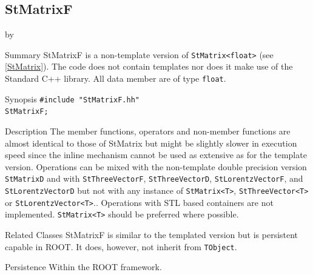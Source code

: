 \documentclass[twoside]{article}
\newcommand{\entrylabel}[1]{\mbox{\textbf{{#1}}}\hfil}%
\newenvironment{entry}
{\begin{list}{}%
    {\renewcommand{\makelabel}{\entrylabel}%
     \setlength{\labelwidth}{90pt}%
     \setlength{\leftmargin}{\labelwidth}
     \advance\leftmargin by \labelsep%
      }%
    }%
  {\end{list}}
\newcommand{\Entrylabel}[1]%
{\raisebox{0pt}[1ex][0pt]{\makebox[\labelwidth][l]%
    {\parbox[t]{\labelwidth}{\hspace{0pt}\textbf{{#1}}}}}}
\newenvironment{Entry}%
{\renewcommand{\entrylabel}{\Entrylabel}\begin{entry}}%
  {\end{entry}}
\begin{document}
\subsection{StMatrixF } \label{StMatrixF}
\begin{Entry}
\item[Summary]
    StMatrixF is a non-template version of \verb+StMatrix<float>+
    (see \ref{StMatrix}). The code does not contain templates nor
    does it make use of the Standard C++ library. All data member are of
    type \texttt{float}.
    
\item[Synopsis]
    \verb+#include "StMatrixF.hh"+ \\
    \verb+StMatrixF;+
    
    
\item[Description]       
    The member functions, operators and non-member functions are almost identical
    to those of StMatrix but might be slightly slower in execution speed
    since the inline mechanism cannot be used as extensive as for the template
    version. Operations can be mixed with the non-template double precision version
    \texttt{StMatrixD} and with \texttt{StThreeVectorF}, \texttt{StThreeVectorD},
    \texttt{StLorentzVectorF}, and \texttt{StLorentzVectorD}
    but not with any instance of \verb+StMatrix<T>+, \verb+StThreeVector<T>+ or
    \verb+StLorentzVector<T>+..
    Operations with STL based containers are not implemented.
    \verb+StMatrix<T>+ should be preferred where possible.
    
\item[Related Classes]
    StMatrixF is similar to the templated version but
    is persistent capable in ROOT. It does, however, not inherit
    from \texttt{TObject}.

\item[Persistence]
    Within the ROOT framework.

\end{Entry}

%
%
\end{document}
